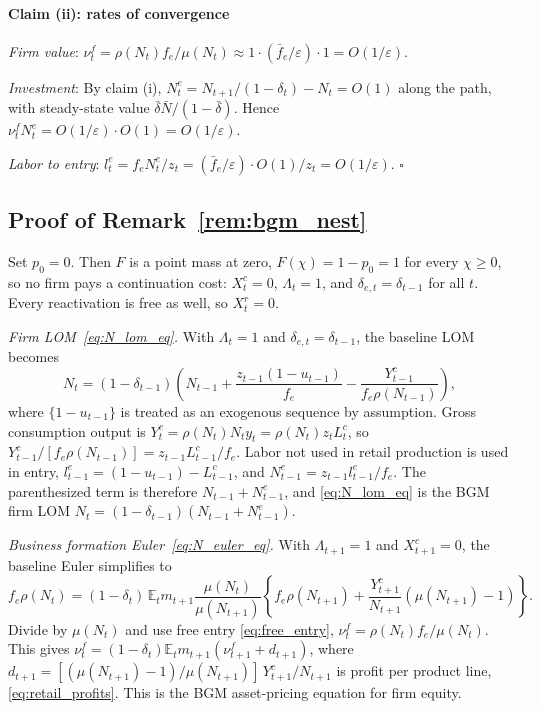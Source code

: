 \documentclass[authoryear, review, 12pt]{elsarticle}
\begin{document}
\paragraph{Claim (ii): rates of convergence}

\emph{Firm value}: $\nu_t^f=\rho(N_t)f_e/\mu(N_t)
\approx 1\cdot(\bar{f}_e/\varepsilon)\cdot 1 =
O(1/\varepsilon)$.

\emph{Investment}: By claim (i), $N_t^e=N_{t+1}/(1-\delta_t)-N_t=O(1)$ along the path,
with steady-state value $\bar{\delta}\bar{N}/(1-\bar{\delta})$. Hence
$\nu_t^f N_t^e = O(1/\varepsilon)\cdot O(1)
= O(1/\varepsilon)$.

\emph{Labor to entry}: $l_t^e=f_eN_t^e/z_t = 
(\bar{f}_e/\varepsilon)\cdot O(1)/z_t = 
O(1/\varepsilon)$. $\square$

\subsection*{Proof of Remark~\ref{rem:bgm_nest}}

Set $p_0=0$. Then $F$ is a point mass at zero, $F(\chi)=1-p_0=1$ for every $\chi\geq0$,
so no firm pays a continuation cost: $X_t^c=0$, $\Lambda_t=1$, and
$\delta_{e,t}=\delta_{t-1}$ for all $t$. Every reactivation is free as well, so $X_t^r=0$.

\emph{Firm LOM~\eqref{eq:N_lom_eq}.} With $\Lambda_t=1$
and $\delta_{e,t}=\delta_{t-1}$, the baseline LOM becomes
\begin{equation*}
  N_t = (1-\delta_{t-1})\!\left(N_{t-1}
  + \frac{z_{t-1}(1-u_{t-1})}{f_e}
  - \frac{Y_{t-1}^c}{f_e\rho(N_{t-1})}\right),
\end{equation*}
where $\{1-u_{t-1}\}$ is treated as an exogenous
sequence by assumption. Gross consumption output is $Y_t^c=\rho(N_t)N_ty_t=\rho(N_t)z_tL^c_t$,
so $Y^c_{t-1}/[f_e\rho(N_{t-1})]=z_{t-1}L^c_{t-1}/f_e$. Labor not used in retail production
is used in entry, $l^e_{t-1}=(1-u_{t-1})-L^c_{t-1}$, and $N^e_{t-1}=z_{t-1}l^e_{t-1}/f_e$. The
parenthesized term is therefore $N_{t-1}+N^e_{t-1}$, and \eqref{eq:N_lom_eq} is the BGM firm
LOM $N_t=(1-\delta_{t-1})(N_{t-1}+N^e_{t-1})$.

\emph{Business formation Euler~\eqref{eq:N_euler_eq}.}
With $\Lambda_{t+1}=1$ and $X_{t+1}^c=0$, the baseline
Euler simplifies to
\begin{equation*}
  f_e\rho(N_t) = (1-\delta_t)\,\mathbb{E}_t m_{t+1}
  \frac{\mu(N_t)}{\mu(N_{t+1})}
  \left\{f_e\rho(N_{t+1})
  + \frac{Y_{t+1}^c}{N_{t+1}}(\mu(N_{t+1})-1)\right\}.
\end{equation*}
Divide by $\mu(N_t)$ and use free entry \eqref{eq:free_entry},
$\nu_t^f=\rho(N_t)f_e/\mu(N_t)$. This gives
$\nu^f_t=(1-\delta_t)\mathbb{E}_tm_{t+1}(\nu^f_{t+1}+d_{t+1})$, where
$d_{t+1}=[(\mu(N_{t+1})-1)/\mu(N_{t+1})]\,Y^c_{t+1}/N_{t+1}$ is profit per product line,
\eqref{eq:retail_profits}. This is the BGM asset-pricing equation for firm equity.
\end{document}
